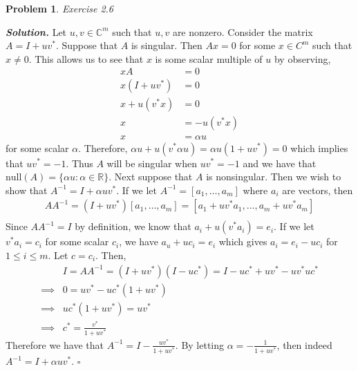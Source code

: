 \documentclass[12pt]{report}
\newtheorem{problem}{Problem}
\newenvironment{solution}[1][\it{Solution}]{\textbf{#1. } }{$\square$}
\def\C{{\mathbb C}}
\def\R{{\mathbb R}}
\begin{document}

\begin{problem}
    Exercise 2.6
\end{problem}

\begin{solution}
    \noindent
    Let $u,v \in \C^m$ such that $u,v$ are nonzero. Consider the matrix $A = I + uv^*$. Suppose that $A$ is singular. Then $Ax = 0$ for some $x \in C^{m}$ such that $x \neq 0$. This allows us to see that $x$ is some scalar multiple of $u$ by observing,
    \begin{align*}
        xA &= 0\\
        x(I + uv^*) &= 0\\
        x + u(v^*x) &= 0\\
        x &= -u(v^*x)\\
        x &= \alpha u
    \end{align*}
    for some scalar $\alpha$. Therefore, $\alpha u + u(v^*\alpha u) = \alpha u (1 + uv^*) = 0$ which implies that $uv^* = -1$. Thus $A$ will be singular when $uv^* = -1$ and we have that $\text{null}(A) = \{\alpha u : \alpha \in \R\}$.
    \noindent
    Next suppose that $A$ is nonsingular. Then we wish to show that $A^{-1} = I + \alpha u v^*$. If we let $A^{-1} = [a_1,\dots,a_m]$ where $a_i$ are vectors, then 
    \begin{align*}
        AA^{-1} = (I + uv^*)[a_1,\dots,a_m] = [a_1 + uv^*a_1, \dots, a_m + uv^*a_m]\\       
    \end{align*}
    Since $AA^{-1} = I$ by definition, we know that $a_i + u(v^*a_i) = e_i$. If we let $v^*a_i = c_i$ for some scalar $c_i$, we have $a_u + uc_i = e_i$ which gives $a_i = e_i - uc_i$ for $1 \leq i \leq m$. Let $c = {c_i}$. Then,
    \begin{align*}
        &I = AA^{-1} = (I + uv^*)(I - uc^*) = I - uc^* + uv^* - uv^*uc^*\\
        \implies &0 = uv^* - uc^*(1 + uv^*)\\
        \implies  &uc^*(1 + uv^*) = uv^*\\
        \implies &c^* = \frac{v^*}{1 + uv^*}
    \end{align*}
    Therefore we have that $A^{-1} = I - \frac{uv^*}{1 + uv^*}$. By letting $\alpha = - \frac{1}{1 + uv^*}$, then indeed $A^{-1} = I + \alpha u v^*$.
\end{solution}

\end{document}
